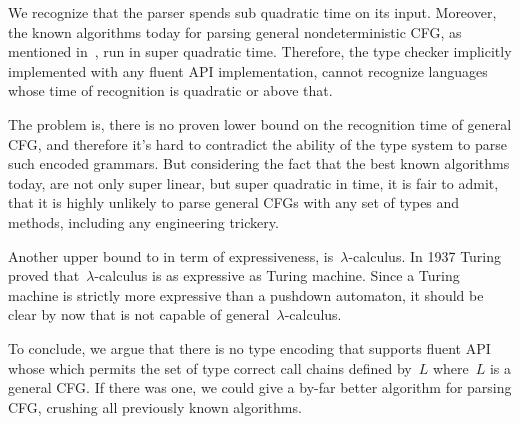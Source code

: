 We recognize that the \Java parser spends sub quadratic time
  on its input.
Moreover, the known algorithms today for parsing general 
  nondeterministic CFG, as mentioned in~, run in 
  super quadratic time.
Therefore,
  the type checker implicitly implemented with any fluent API implementation,
  cannot recognize languages whose time of recognition is quadratic or above that.

The problem is, there is no proven lower bound on the recognition time of general CFG,
  and therefore it's hard to contradict the ability of the type system to parse such 
  encoded grammars.
But considering the fact that the best known algorithms today, 
  are not only super linear, but super quadratic in time,
  it is fair to admit, that it is highly unlikely to parse general CFGs
  with any set of \Java types and methods, including any engineering trickery.

Another upper bound to \Self in term of expressiveness, is~$\lambda$-calculus.
In 1937 Turing~\cite{Turing:37} proved that~$\lambda$-calculus is as expressive as Turing machine.
Since a Turing machine is strictly more expressive than a pushdown automaton, 
  it should be clear by now that \Self is not capable of general~$\lambda$-calculus.


To conclude, we argue that there is no type encoding that supports fluent API whose
  which permits the set of type correct call chains defined by~$L$ where~$L$ is a general CFG\@. 
If there was one, we could give a by-far better algorithm for parsing CFG,
  crushing all previously known algorithms.
